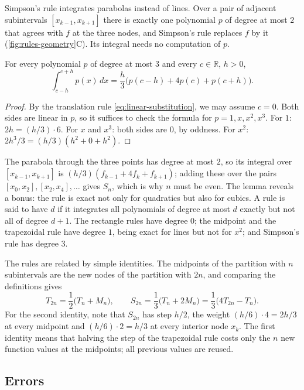 Simpson's rule integrates parabolas instead of lines. Over a pair of adjacent subintervals $[x_{k-1},x_{k+1}]$ there is exactly one polynomial $p$ of degree at most $2$ that agrees with $f$ at the three nodes, and Simpson's rule replaces $f$ by it (\cref{fig:rules-geometry}C). Its integral needs no computation of $p$.

\begin{lemma}
\label{lem:simpson-exact}
For every polynomial $p$ of degree at most $3$ and every $c\in\mathbb R$, $h>0$,
\[
\int_{c-h}^{c+h}p(x)\,dx=\frac h3\bigl(p(c-h)+4p(c)+p(c+h)\bigr).
\]
\end{lemma}

\begin{proof}
By the translation rule \eqref{eq:linear-substitution}, we may assume $c=0$. Both sides are linear in $p$, so it suffices to check the formula for $p=1,x,x^2,x^3$. For $1$: $2h=(h/3)\cdot6$. For $x$ and $x^3$: both sides are $0$, by oddness. For $x^2$: $2h^3/3=(h/3)(h^2+0+h^2)$.
\end{proof}

The parabola through the three points has degree at most $2$, so its integral over $[x_{k-1},x_{k+1}]$ is $(h/3)(f_{k-1}+4f_k+f_{k+1})$; adding these over the pairs $[x_0,x_2],[x_2,x_4],\ldots$ gives $S_n$, which is why $n$ must be even. The lemma reveals a bonus: the rule is exact not only for quadratics but also for cubics. A rule is said to have  $d$ if it integrates all polynomials of degree at most $d$ exactly but not all of degree $d+1$. The rectangle rules have degree $0$; the midpoint and the trapezoidal rule have degree $1$, being exact for lines but not for $x^2$; and Simpson's rule has degree $3$.

The rules are related by simple identities. The midpoints of the partition with $n$ subintervals are the new nodes of the partition with $2n$, and comparing the definitions gives
\begin{equation}
T_{2n}=\frac12\bigl(T_n+M_n\bigr),\qquad S_{2n}=\frac13\bigl(T_n+2M_n\bigr)=\frac13\bigl(4T_{2n}-T_n\bigr).
\label{eq:rule-relations}
\end{equation}
For the second identity, note that $S_{2n}$ has step $h/2$, the weight $(h/6)\cdot4=2h/3$ at every midpoint and $(h/6)\cdot2=h/3$ at every interior node $x_k$. The first identity means that halving the step of the trapezoidal rule costs only the $n$ new function values at the midpoints; all previous values are reused.

\subsection{Errors}

